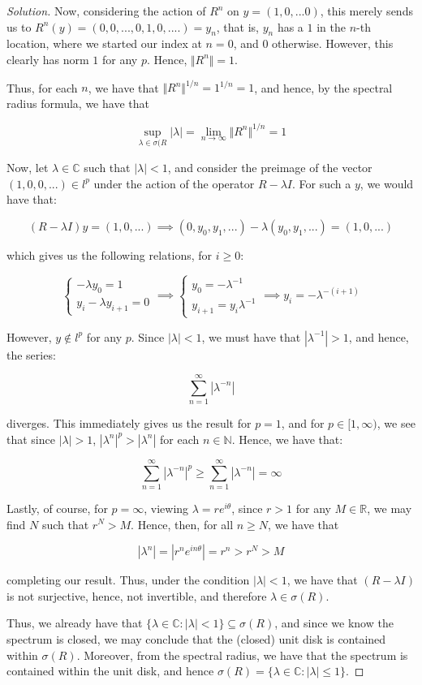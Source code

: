 \documentclass[10pt]{article}
\begin{document}
\begin{proof}[Solution]
Now, considering the action of $R^n$ on $y =(1,0,...0)$, this merely sends us to $R^n(y) = (0,0,...,0,1,0,....) = y_n$, that is, $y_n$ has a $1$ in the $n$-th location, where we started our index at $n=0$, and $0$ otherwise. However, this clearly has norm $1$ for any $p$. Hence, $\Vert R^n \Vert =1$.

Thus, for each $n$, we have that $\Vert R^n \Vert ^{1/n} = 1^{1/n} = 1$, and hence, by the spectral radius formula, we have that 

$$\sup_{\lambda \in \sigma(R} |\lambda |= \lim_{n \to \infty} \Vert R^n \Vert^{1/n} = 1$$

Now, let $\lambda \in \mathbb{C}$ such that $|\lambda | < 1$, and consider the preimage of the vector $(1,0,0,...) \in l^p$ under the action of the operator $R - \lambda I$. For such a $y$, we would have that:

$$ (R - \lambda I)y = (1,0,...) \implies (0, y_0, y_1,...) - \lambda(y_0, y_1,...) = (1,0,...)$$

which gives us the following relations, for $i \geq 0$:

$$ \begin{cases} - \lambda y_0 = 1 \\ y_{i} - \lambda y_{i+1} = 0 \end{cases} \implies \begin{cases} y_0 = -\lambda^{-1} \\ y_{i+1} = y_i \lambda^{-1} \end{cases} \implies y_i = -\lambda^{-(i+1)} $$

However, $y \not \in l^p$ for any $p$. Since $|\lambda| < 1$, we must have that $|\lambda^{-1}| > 1$, and hence, the series:

$$ \sum_{n=1}^\infty | \lambda^{-n}| $$

diverges. This immediately gives us the result for $p=1$, and for $p \in [1,\infty)$, we see that since $|\lambda| > 1$, $| \lambda^n|^p > |\lambda^n|$ for each $n \in \mathbb{N}$. Hence, we have that:

$$ \sum_{n=1}^\infty | \lambda^{-n}|^p \geq \sum_{n=1}^\infty |\lambda^{-n}|  = \infty $$

Lastly, of course, for $p = \infty$, viewing $\lambda = r e^{i \theta}$, since $r > 1$ for any $M \in \mathbb{R}$, we may find $N$ such that $r^N > M$. Hence, then, for all $n \geq N$, we have that

$$|\lambda^n| =  | r^n e^{i n \theta} | = r^n > r^N > M $$

completing our result. Thus, under the condition $| \lambda| < 1$, we have that $(R - \lambda I )$ is not surjective, hence, not invertible, and therefore $\lambda \in \sigma(R)$.

Thus, we already have that $\{ \lambda \in \mathbb{C} : |\lambda | < 1 \} \subseteq \sigma(R)$, and since we know the spectrum is closed, we may conclude that the (closed) unit disk is contained within $\sigma(R)$. Moreover, from the spectral radius, we have that the spectrum is contained within the unit disk, and hence $\sigma(R) = \{ \lambda \in \mathbb{C} : | \lambda| \leq 1 \}$.

\end{proof}
\end{document}
